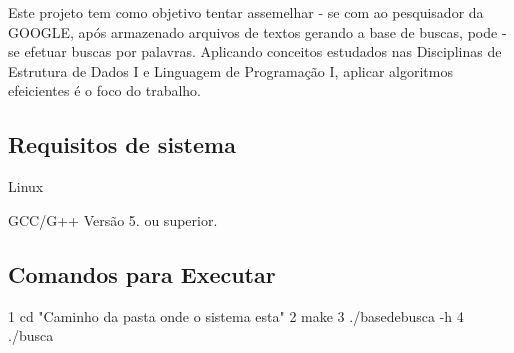 Este projeto tem como objetivo tentar assemelhar -\/ se com ao pesquisador da G\+O\+O\+G\+LE, após armazenado arquivos de textos gerando a base de buscas, pode -\/ se efetuar buscas por palavras. Aplicando conceitos estudados nas Disciplinas de Estrutura de Dados I e Linguagem de Programação I, aplicar algoritmos efeicientes é o foco do trabalho.

\subsection*{Requisitos de sistema }


\begin{DoxyItemize}
\item Linux
\item G\+C\+C/\+G++ Versão 5. ou superior.
\end{DoxyItemize}

\subsection*{Comandos para Executar }


\begin{DoxyCode}
1 cd "Caminho da pasta onde o sistema esta"
2 make
3 ./basedebusca -h
4 ./busca
\end{DoxyCode}
 